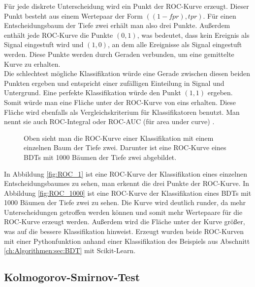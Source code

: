 F\"ur jede diskrete Unterscheidung wird ein Punkt der ROC-Kurve erzeugt. Dieser Punkt besteht aus einem Wertepaar der Form $((1-fpr),tpr)$. F\"ur einen Entscheidungsbaum der Tiefe zwei erh\"alt man also drei Punkte. Au\ss erdem enth\"alt jede ROC-Kurve die Punkte $(0,1)$, was bedeutet, dass kein Ereignis als Signal eingestuft wird und $(1,0)$, an dem alle Ereignisse als Signal eingestuft werden. Diese Punkte werden durch Geraden verbunden, um eine gemittelte Kurve zu erhalten.\\
Die schlechtest m\"ogliche Klassifikation w\"urde eine Gerade zwischen diesen beiden Punkten ergeben und entspricht einer zuf\"alligen Einteilung in Signal und Untergrund. Eine perfekte Klassifikation w\"urde den Punkt $(1,1)$ ergeben. Somit w\"urde man eine Fl\"ache unter der ROC-Kurve von eins erhalten. Diese Fl\"ache wird ebenfalls als Vergleichskriterium f\"ur Klassifikatoren benutzt. Man nennt sie auch ROC-Integral oder ROC-AUC (f\"ur area under curve) \cite{ROC_Graphs}.

\begin{figure}[tbp]
\centering     %
{}
\parbox[b]{12cm}{
\caption{Oben sieht man die ROC-Kurve einer Klassifikation mit einem einzelnen Baum der Tiefe zwei. Darunter ist eine ROC-Kurve eines BDTs mit 1000 B\"aumen der Tiefe zwei abgebildet.}}
\end{figure}

In Abbildung \ref{fig:ROC_1} ist eine ROC-Kurve der Klassifikation eines einzelnen Entscheidungsbaumes zu sehen, man erkennt die drei Punkte der ROC-Kurve. In Abbildung \ref{fig:ROC_1000} ist eine ROC-Kurve der Klassifikation eines BDTs mit 1000 B\"aumen der Tiefe zwei zu sehen. Die Kurve wird deutlich runder, da mehr Unterscheidungen getroffen werden k\"onnen und somit mehr Wertepaare f\"ur die ROC-Kurve erzeugt werden. Au\ss erdem wird die Fl\"ache unter der Kurve gr\"o\ss er, was auf die bessere Klassifikation hinweist.
Erzeugt wurden beide ROC-Kurven mit einer Pythonfunktion anhand einer Klassifikation des Beispiels aus Abschnitt \ref{ch:Algorithmen:sec:BDT} mit Scikit-Learn.

\subsection{Kolmogorov-Smirnov-Test}
\label{ch:Vergleich:subsec:KSTest}

